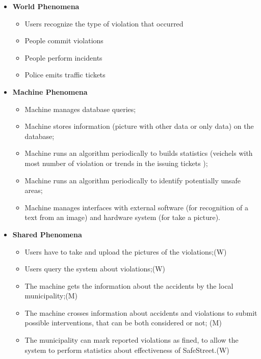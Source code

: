 \documentclass[../RASD.tex]{subfiles}
\begin{document}
    \begin{itemize}
        \item \textbf{World Phenomena}
        \begin{itemize}
            \item Users recognize the type of violation that occurred
            \item People commit violations
            \item People perform incidents
            \item Police emits traffic tickets
        \end{itemize}
        \item \textbf{Machine Phenomena}
        \begin{itemize}
            \item Machine manages database queries;
            \item Machine stores information (picture with other data or only data) on the database;
            \item Machine runs an algorithm periodically to builds statistics (veichels with most number of violation or trends in the issuing tickets );
            \item Machine runs an algorithm periodically to identify potentially unsafe areas;
            \item Machine manages interfaces with external software (for recognition of a text from an image) and hardware system (for take a picture).
        \end{itemize}
        \item \textbf{Shared Phenomena}
        \begin{itemize}
            \item Users have to take and upload the pictures of the violations;(W)
            \item Users query the system about violations;(W)
            \item The machine gets the information about the accidents by the local municipality;(M)
            \item The machine crosses information about accidents and violations to submit possible interventions, that can be both considered or not; (M)
            \item The municipality can mark reported violations as fined, to allow the system to perform statistics about effectiveness of SafeStreet.(W)
        \end{itemize}
    \end{itemize}
\end{document}
